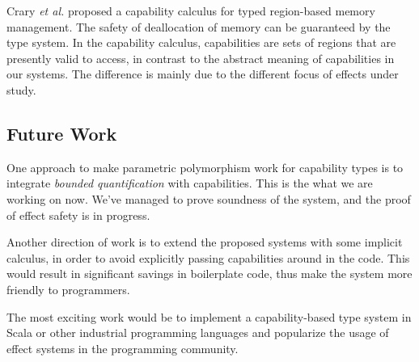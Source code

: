 Crary \emph{et al.} proposed a capability calculus for typed
region-based memory management\cite{crary1999typed}. The safety of
deallocation of memory can be guaranteed by the type system. In the
capability calculus, capabilities are sets of regions that are
presently valid to access, in contrast to the abstract meaning of
capabilities in our systems. The difference is mainly due to the
different focus of effects under study.

\subsection{Future Work}

One approach to make parametric polymorphism work for capability types
is to integrate \emph{bounded quantification} with capabilities. This
is the what we are working on now. We've managed to prove soundness of
the system, and the proof of effect safety is in progress.

Another direction of work is to extend the proposed systems with some
implicit calculus, in order to avoid explicitly passing capabilities
around in the code. This would result in significant savings in
boilerplate code, thus make the system more friendly to programmers.

The most exciting work would be to implement a capability-based type
system in Scala or other industrial programming languages and
popularize the usage of effect systems in the programming community.
